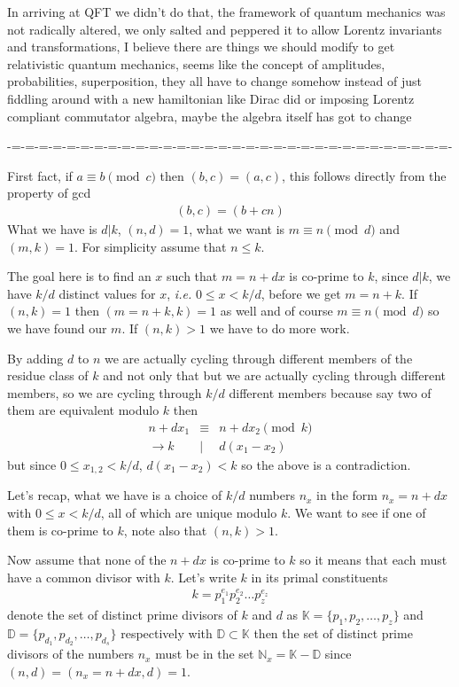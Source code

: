 \documentclass[aps,preprint,preprintnumbers,nofootinbib,showpacs,prd]{revtex4-1}
\newcommand{\ie}{{\it i.e.} }
\newcommand{\nbea}{\begin{eqnarray*}}
\newcommand{\neea}{\end{eqnarray*}}
\begin{document}
In arriving at QFT we didn't do that, the framework of quantum mechanics was not radically altered, we only salted and peppered it to allow Lorentz invariants and transformations, I believe there are things we should modify to get relativistic quantum mechanics, seems like the concept of amplitudes, probabilities, superposition, they all have to change somehow instead of just fiddling around with a new hamiltonian like Dirac did or imposing Lorentz compliant commutator algebra, maybe the algebra itself has got to change

-=-=-=-=-=-=-=-=-=-=-=-=-=-=-=-=-=-=-=-=-=-=-=-=-=-=-=-=-=-=-=-=-

First fact, if $a \equiv b \pmod{c}$ then $(b,c)=(a,c)$, this follows directly from the property of gcd
%
\nbea
(b,c) = (b + cn)
\neea
%
What we have is $d|k$, $(n,d)=1$, what we want is $m \equiv n \pmod{d}$ and $(m,k) = 1$. For simplicity assume that $n \le k$.

The goal here is to find an $x$ such that $m = n + dx$ is co-prime to $k$, since $d|k$, we have $k/d$ distinct values for $x$, \ie $0 \le x < k/d$, before  we get $m = n + k$. If $(n,k)=1$ then $(m = n+k,k)=1$ as well and of course $m \equiv n \pmod{d}$ so we have found our $m$. If $(n,k) > 1$ we have to do more work.

By adding $d$ to $n$ we are actually cycling through different members of the residue class of $k$ and not only that but we are actually cycling through different members, so we are cycling through $k/d$ different members because say two of them are equivalent modulo $k$ then
%
\nbea
n + dx_1 & \equiv & n + dx_2 \pmod{k} \\
\to k &|& d (x_1 - x_2)
\neea
%
but since $0 \le x_{1,2} < k/d$, $d(x_1 - x_2) < k$ so the above is a contradiction.

Let's recap, what we have is a choice of $k/d$ numbers $n_x$ in the form $n_x = n + dx$ with $0 \le x < k/d$, all of which are unique modulo $k$. We want to see if one of them is co-prime to $k$, note also that $(n,k) > 1$.

Now assume that none of the $n + dx$ is co-prime to $k$ so it means that each must have a common divisor with $k$. Let's write $k$ in its primal constituents
%
\nbea
k = p_1^{e_1}p_2^{e_2} \dots p_z^{e_z}
\neea
%
denote the set of distinct prime divisors of $k$ and $d$ as $\mathbb{K} = \{p_1, p_2, \dots, p_z\}$ and $\mathbb{D} = \{p_{d_1}, p_{d_2}, \dots, p_{d_s}\}$ respectively with $\mathbb{D} \subset \mathbb{K}$ then the set of distinct prime divisors of the numbers $n_x$ must be in the set $\mathbb{N}_x = \mathbb{K} - \mathbb{D}$ since $(n,d) = (n_x = n + dx, d) = 1$.
\end{document}
